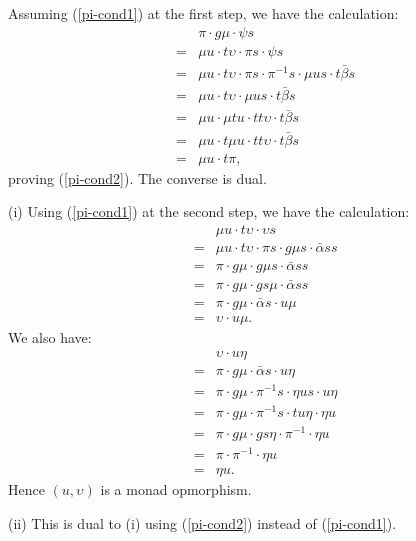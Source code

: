 \documentclass[a4paper,10pt]{article}
\newenvironment{proof}[1][Proof]{\begin{trivlist}
\item[\hskip \labelsep {\bfseries #1}]}{\end{trivlist}}
\numberwithin{equation}{section}
\begin{document}
\begin{proof} 
Assuming (\ref{pi-cond1}) at the first step, we have the calculation: 
\begin{eqnarray*}
&& \pi \cdot g \mu \cdot \psi s \\
& = & \mu u \cdot t \upsilon \cdot \pi s \cdot \psi s \\
& = & \mu u \cdot t \upsilon \cdot \pi s \cdot \pi^{-1} s \cdot \mu us \cdot t \bar{\beta} s \\
& = & \mu u \cdot t \upsilon \cdot \mu us \cdot t \bar{\beta} s \\
& = & \mu u \cdot \mu tu \cdot tt \upsilon \cdot t \bar{\beta} s \\
& = & \mu u \cdot t \mu u \cdot tt \upsilon \cdot t \bar{\beta} s \\
& = & \mu u \cdot t \pi  ,
\end{eqnarray*}
proving (\ref{pi-cond2}). The converse is dual.   

(i) Using (\ref{pi-cond1}) at the second step, we have the calculation:
\begin{eqnarray*}
&& \mu u \cdot t \upsilon \cdot \upsilon s  \\
& = &  \mu u \cdot t \upsilon \cdot \pi s \cdot g \mu s \cdot \bar{\alpha} ss  \\
& = &  \pi \cdot g \mu \cdot g \mu s \cdot \bar{\alpha} ss  \\
& = &  \pi \cdot g \mu \cdot gs \mu \cdot \bar{\alpha} ss  \\
& = &  \pi \cdot g \mu \cdot \bar{\alpha} s \cdot  u \mu  \\
& = & \upsilon \cdot u \mu .
\end{eqnarray*}  
We also have:
\begin{eqnarray*}
&& \upsilon \cdot u \eta  \\
& = &  \pi \cdot g \mu \cdot \bar{\alpha} s \cdot u \eta   \\
& = &  \pi \cdot g \mu \cdot \pi^{-1} s \cdot \eta us \cdot u \eta  \\
& = &  \pi \cdot g \mu \cdot \pi^{-1} s \cdot tu \eta \cdot \eta u   \\
& = &  \pi \cdot g \mu \cdot gs \eta \cdot \pi^{-1} \cdot \eta u  \\
& = &  \pi \cdot \pi^{-1} \cdot \eta u  \\
& = &   \eta u .
\end{eqnarray*}  
Hence $(u,\upsilon)$ is a monad opmorphism.

(ii) This is dual to (i) using (\ref{pi-cond2}) instead of (\ref{pi-cond1}). 


\end{proof}
\end{document}

